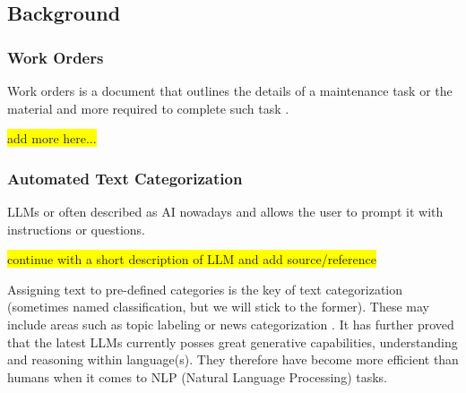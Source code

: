 \documentclass{article}
\begin{document}
\subsection{Background}








\subsubsection{Work Orders}

Work orders is a document that outlines the details of a maintenance task or the material and more required
to complete such task \cite{ibm2023}.

\colorbox{yellow}{add more here...}

\subsubsection{Automated Text Categorization}

LLMs or often described as AI nowadays and allows the user to prompt it with instructions or questions.

\colorbox{yellow}{continue with a short description of LLM and add source/reference}

Assigning text to pre-defined categories is the key of text categorization
(sometimes named classification, but we will stick to the former).
These may include areas such as topic labeling or news categorization \cite{zhang2024}.
It has further proved that the latest LLMs currently posses great generative capabilities, understanding
and reasoning within language(s).
They therefore have become more efficient than humans when it comes to NLP (Natural Language Processing)
tasks.
\end{document}
